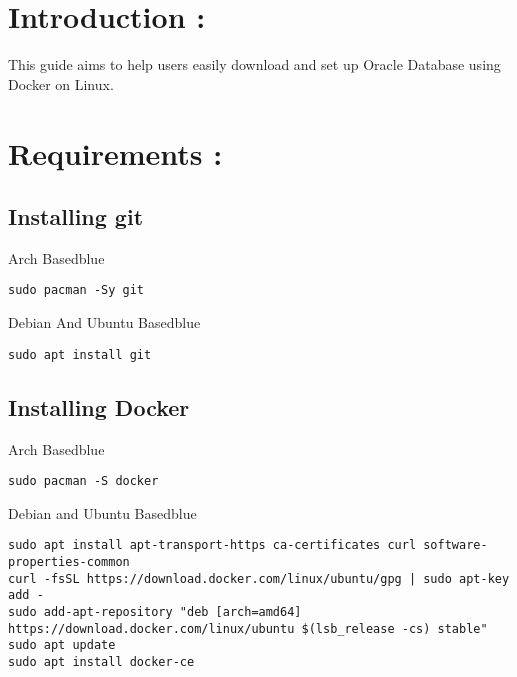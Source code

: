 \documentclass{article}
\begin{document}
\section{Introduction : }
This guide aims to help users easily download and set up Oracle Database using Docker on Linux.
\section{Requirements : }

\subsection{Installing git}

\vspace{0.25cm}
\begin{prettyBox}{Arch Based}{blue}
    \begin{verbatim}
sudo pacman -Sy git
    \end{verbatim}
\end{prettyBox}

\vspace{0.5cm}

\begin{prettyBox}{Debian And Ubuntu Based}{blue}
    \begin{verbatim}
sudo apt install git
    \end{verbatim}
\end{prettyBox}

\vspace{0.25cm}
\subsection{Installing Docker}

\vspace{0.25cm}
\begin{prettyBox}{Arch Based}{blue}
    \begin{verbatim}
sudo pacman -S docker
   \end{verbatim}
\end{prettyBox}

\vspace{0.5cm}
\begin{prettyBox}{Debian and Ubuntu Based}{blue}
    \begin{verbatim}
sudo apt install apt-transport-https ca-certificates curl software-properties-common
curl -fsSL https://download.docker.com/linux/ubuntu/gpg | sudo apt-key add -
sudo add-apt-repository "deb [arch=amd64] https://download.docker.com/linux/ubuntu $(lsb_release -cs) stable"
sudo apt update
sudo apt install docker-ce
 \end{verbatim}
\end{prettyBox}
\end{document}
